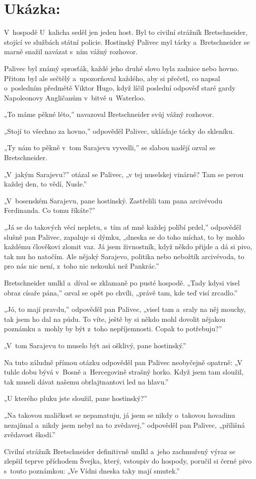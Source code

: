 \section*{Ukázka:}

V~hospodě U~kalicha seděl jen jeden host. Byl to civilní strážník Bretschneider, stojící ve službách státní policie. Hostinský Palivec myl tácky a~Bretschneider se marně snažil navázat s~ním vážný rozhovor.

Palivec byl známý sprosťák, každé jeho druhé slovo byla zadnice nebo hovno. Přitom byl ale sečtělý a~upozorňoval každého, aby si přečetl, co napsal o~posledním předmětě Viktor Hugo, když líčil poslední odpověď staré gardy Napoleonovy Angličanům v~bitvě u~Waterloo.

„To máme pěkné léto,” navazoval Bretschneider svůj vážný rozhovor.

„Stojí to všechno za hovno,” odpověděl Palivec, ukládaje tácky do skleníku.

„Ty nám to pěkně v~tom Sarajevu vyvedli,” se slabou nadějí ozval se Bretschneider.

„V~jakým Sarajevu?” otázal se Palivec, „v tej nuselskej vinárně? Tam se perou každej den, to vědí, Nusle.”

„V~bosenském Sarajevu, pane hostinský. Zastřelili tam pana arcivévodu Ferdinanda. Co tomu říkáte?”

„Já se do takových věcí nepletu, s~tím ať mně každej políbí prdel,” odpověděl slušně pan Palivec, zapaluje si dýmku, „dneska se do toho míchat, to by mohlo každému člověkovi zlomit vaz. Já jsem živnostník, když někdo přijde a dá si pivo, tak mu ho natočím. Ale nějaký Sarajevo, politika nebo nebožtík arcivévoda, to pro nás nic není, z~toho nic nekouká než Pankrác.”

Bretschneider umlkl a~díval se zklamaně po pusté hospodě. „Tady kdysi visel obraz císaře pána,” ozval se opět po chvíli, „právě tam, kde teď visí zrcadlo.”

„Jó, to mají pravdu,” odpověděl pan Palivec, „visel tam a~sraly na něj mouchy, tak jsem ho dal na půdu. To víte, ještě by si někdo mohl dovolit nějakou poznámku a~mohly by být z~toho nepříjemnosti. Copak to potřebuju?”

„V~tom Sarajevu to muselo být asi ošklivý, pane hostinský.”

Na tuto záludně přímou otázku odpověděl pan Palivec neobyčejně opatrně: „V tuhle dobu bývá v~Bosně a~Hercegovině strašný horko. Když jsem tam sloužil, tak museli dávat našemu obrlajtnantovi led na hlavu.”

„U kterého pluku jste sloužil, pane hostinský?”

„Na takovou maličkost se nepamatuju, já jsem se nikdy o~takovou hovadinu nezajímal a~nikdy jsem nebyl na to zvědavej,” odpověděl pan Palivec, „přílišná zvědavost škodí.”

Civilní strážník Bretschneider definitivně umlkl a~jeho zachmuřený výraz se zlepšil teprve příchodem Švejka, který, vstoupiv do hospody, poručil si černé pivo s~touto poznámkou: „Ve Vídni dneska taky mají smutek.”

\cite{osudy_dobreho_vojaka_svejka}

\newpage

